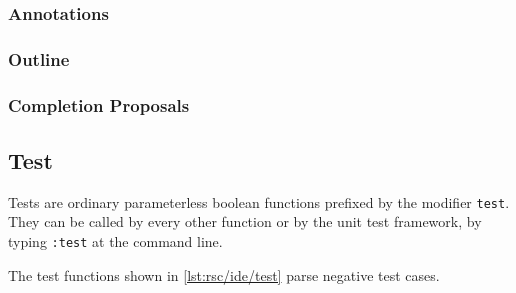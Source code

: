 \subsubsection{Annotations}



\subsubsection{Outline}





\subsubsection{Completion Proposals}



\subsection{Test}

Tests are ordinary parameterless boolean functions prefixed by the modifier \lstinline[language=rascal]{test}.
They can be called by every other function or by the unit test framework, by typing \texttt{:test} at the command line.

The test functions shown in \autoref{lst:rsc/ide/test} parse negative test cases.



